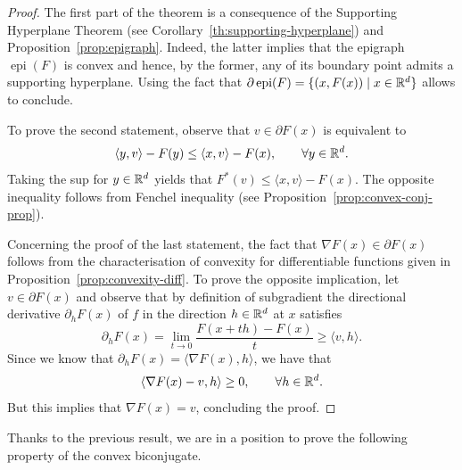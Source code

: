 \documentclass{report}
\begin{document}
\begin{proof}
	The first part of the theorem is a consequence of the Supporting Hyperplane Theorem (see Corollary~\ref{th:supporting-hyperplane}) and Proposition~\ref{prop:epigraph}. Indeed, the latter implies that the epigraph $\operatorname{epi}(F)$ is convex and hence, by the former, any of its boundary point admits a supporting hyperplane. Using the fact that $\partial\operatorname{epi}(F)=\{(x,F(x))\mid x\in\mathbb{R}^d\}$ allows to conclude.

	To prove the second statement, observe that $v\in\partial F(x)$ is equivalent to
	\begin{equation}
		\langle y,v\rangle - F(y) \le \langle x,v\rangle-F(x), \qquad \forall y\in\mathbb{R}^d.
	\end{equation}
	Taking the sup for $y\in\mathbb{R}^d$ yields that $F^*(v)\le \langle x,v\rangle -F(x)$. The opposite inequality follows from Fenchel inequality (see Proposition~\ref{prop:convex-conj-prop}).

	Concerning the proof of the last statement, the fact that $\nabla F(x)\in \partial F(x)$ follows from the characterisation of convexity for differentiable functions given in Proposition~\ref{prop:convexity-diff}.
	To prove the opposite implication, let $v\in \partial F(x)$ and observe that by definition of subgradient the directional derivative $\partial_h F(x)$ of $f$ in the direction $h\in\mathbb{R}^d$ at $x$ satisfies
	\begin{equation}
		\partial_h F(x) = \lim_{t\to 0} \frac{F(x+th)-F(x)}{t} \ge \langle v, h\rangle.
	\end{equation}
	Since we know that $\partial_hF (x)=\langle \nabla F(x),h\rangle$, we have that 
	\begin{equation}
		\langle \nabla F(x) - v,h\rangle \ge 0, \qquad \forall h\in\mathbb{R}^d.
	\end{equation}
	But this implies that $\nabla F(x)=v$, concluding the proof.
\end{proof}



Thanks to the previous result, we are in a position to prove the following property of the convex biconjugate.

\end{document}
